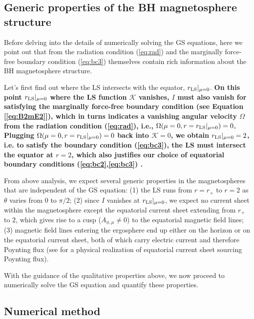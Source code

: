 \documentclass[aps,prd,reprint,nofootinbib, superscriptaddress]{revtex4-1}
\def\Am{A_{\phi,\mu}}
\begin{document}
\subsection{Generic properties of the BH magnetosphere structure}
\label{subsec:features}
Before delving into the details of numerically solving the GS equations,
here we point out that from the radiation condition (\ref{eq:rad}) and the marginally
force-free boundary condition (\ref{eq:bc3})
themselves contain rich information about the BH magnetosphere structure.

Let's first find out where the LS intersects with the equator, $r_{\rm LS}|_{\mu=0}$.
{\bf On this point $r_{\rm LS}|_{\mu=0}$ where the LS function $\mathcal K$ vanishes,
$I$ must also vanish for satisfying the marginally force-free boundary condition (see Equation [\ref{eq:B2mE2}]),
which in turns indicates a vanishing angular velocity $\Omega$ from
the radiation condition (\ref{eq:rad}), i.e., $\Omega(\mu=0, r= r_{\rm LS}|_{\mu=0}) =0$.
Plugging $\Omega(\mu=0, r= r_{\rm LS}|_{\mu=0}) =0$ back into $\mathcal K = 0$,
we obtain $r_{\rm LS}|_{\mu=0}=2$, i.e.
to satisfy the boundary condition (\ref{eq:bc3}), the LS must intersect the equator at $r=2$, which also
justifies our choice of equatorial boundary conditions (\ref{eq:bc2},\ref{eq:bc3}) . }



From above analysis, we expect several generic properties in the magnetospheres that are independent
of the GS equation:
(1) the LS runs from $r=r_+$ to $r=2$ as $\theta$ varies from $0$ to $\pi/2$;
(2) since $I$ vanishes at $r_{\rm LS}|_{\mu=0}$, we expect no current sheet within the magnetosphere except the equatorial current
sheet extending from $r_+$ to $2$, which gives rise to a cusp ($\Am \neq 0$) to the equatorial magnetic field lines;
(3) magnetic field lines entering the ergosphere end up either on the horizon or on the equatorial current sheet,
both of which carry electric current and therefore Poynting flux (see \cite{Punsly1990} for a physical realization of
equatorial current sheet sourcing Poynting flux).

With the guidance of the qualitative properties above, we now proceed to numerically
solve the GS equation and quantify these properties.

\subsection{Numerical method}
\label{subsec:algorithm}
\end{document}
